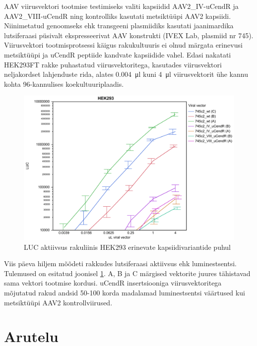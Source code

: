 \documentclass{trkut}%
\begin{document}
AAV viirusvektori tootmise testimiseks valiti kapsiidid AAV2\_IV-uCendR ja AAV2\_VIII-uCendR ning kontrolliks kasutati metsiktüüpi AAV2 kapsiidi. Niinimetatud genoomseks ehk transgeeni plasmiidiks kasutati jaanimardika lutsiferaasi püsivalt ekspresseerivat AAV konstrukti (IVEX Lab, plasmiid nr 745). Viirusvektori tootmisprotsessi käigus rakukultuuris ei olnud märgata erinevusi metsiktüüpi ja uCendR peptiide kandvate kapsiidide vahel. Edasi nakatati HEK293FT rakke puhastatud viirusvektoritega, kasutades viirusvektori neljakordset lahjenduste rida, alates \SI{0,004}{\micro\litre} kuni \SI{4}{\micro\litre} viirusvektorit ühe kannu kohta 96-kannulises koekultuuriplaadis.


\begin{figure}[htbp]
	\includegraphics[width=13cm]{Log HEK293.png}
	\caption{LUC aktiivsus rakuliinis HEK293 erinevate kapsiidivariantide puhul}
	\label{log}
\end{figure}

Viis päeva hiljem mõõdeti rakkudes lutsiferaasi aktiivsus ehk luminestsentsi. Tulemused on esitatud joonisel \ref{log}. A, B ja C märgised vektorite juures tähistavad sama vektori tootmise kordusi. uCendR insertsiooniga viirusvektoritega mõjutatud rakud andsid 50-100 korda madalamad luminestsentsi väärtused kui metsiktüüpi AAV2 kontrollviirused.

\section{Arutelu}
\end{document}
